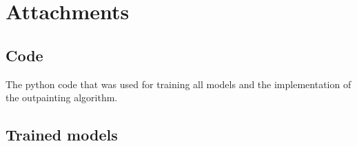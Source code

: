 \documentclass[12pt,a4paper,twoside,openright]{report}
\begin{document}



\tableofcontents













\listoffigures



\appendix
\chapter{Attachments}

\section{Code} \label{attachment_code}

The python code that was used for training all models and the implementation of the outpainting algorithm.

\section{Trained models} \label{attachment_models}
\end{document}

